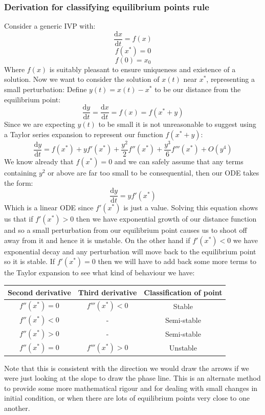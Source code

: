 \documentclass[12pt]{article}
\newcommand{\df}[2]{\frac{\text{d}#1}{\text{d}#2}}
\begin{document}
\subsubsection*{Derivation for classifying equilibrium points rule}
Consider a generic IVP with:
\[\df{x}{t}=f(x)\]
\[f(x^*)=0\]
\[f(0)=x_0\]
Where \(f(x)\) is suitably pleasant to ensure uniqueness and existence of a solution. Now we want to consider the solution of \(x(t)\) near \(x^*\), representing a small perturbation: Define \(y(t)=x(t)-x^*\) to be our distance from the equilibrium point:
\[\df{y}{t}=\df{x}{t}=f(x)=f(x^*+y)\]
Since we are expecting \(y(t)\) to be small it is not unreasonable to suggest using a Taylor series expansion to represent our function \(f(x^*+y)\):
\[\df{y}{t}=f(x^*)+yf'(x^*)+\frac{y^2}{2}f''(x^*)+\frac{y^3}{6}f'''(x^*)+O(y^4)\]
We know already that \(f(x^*)=0\) and we can safely assume that any terms containing \(y^2\) or above are far too small to be consequential, then our ODE takes the form:
\[\df{y}{t}=yf'(x^*)\]
Which is a linear ODE since \(f'(x^*)\) is just a value. Solving this equation shows us that if \(f'(x^*)>0\) then we have exponential growth of our distance function and so a small perturbation from our equilibrium point causes us to shoot off away from it and hence it is unstable. On the other hand if \(f'(x^*)<0\) we have exponential decay and any perturbation will move back to the equilibrium point so it is stable. If \(f'(x^*)=0\) then we will have to add back some more terms to the Taylor expansion to see what kind of behaviour we have:
\begin{table}[H]
    \centering
    \begin{tabular}{|c|c|c|}
    \hline
         \textbf{Second derivative} & \textbf{Third derivative} & \textbf{Classification of point} \\ \hline
         \(f''(x^*)=0\) & \(f'''(x^*)<0\) & Stable \\ \hline
         \(f''(x^*)<0\) & - & Semi-stable \\ \hline
         \(f''(x^*)>0\) & - & Semi-stable \\ \hline
         \(f''(x^*)=0\) & \(f'''(x^*)>0\) & Unstable \\ \hline
    \end{tabular}
\end{table}
Note that this is consistent with the direction we would draw the arrows if we were just looking at the slope to draw the phase line. This is an alternate method to provide some more mathematical rigour and for dealing with small changes in initial condition, or when there are lots of equilibrium points very close to one another.
\end{document}
